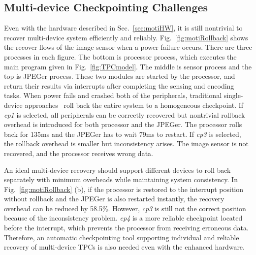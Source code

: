 \subsection{Multi-device Checkpointing Challenges} \label{sec:motiSW}
\vspace{-5pt}
%
Even with the hardware described in Sec.~\ref{sec:motiHW}, it is still nontrivial to recover multi-device system efficiently and reliably. 
Fig.~\ref{fig:motiRollback} shows the recover flows of the image sensor when a power failure occurs.
There are three processes in each figure.
The bottom is processor process, which executes the main program given in Fig.~\ref{fig:TPCmodel}.
The middle is sensor process and the top is JPEGer process. 
These two modules are started by the processor, and return their results via interrupts after completing the sensing and encoding tasks.
When power fails and crashed both of the peripherals, traditional single-device approaches~\cite{ransford2012mementos, balsamo2015hibernus, jayakumar2014quickrecall} roll back the entire system to a homogeneous checkpoint.
If \emph{cp1} is selected, all peripherals can be correctly recovered but nontrivial rollback overhead is introduced for both processor and the JPEGer. 
The processor rolls back for 135ms and the JPEGer has to wait 79ms to restart.
If \emph{cp3} is selected, the rollback overhead is smaller but inconsistency arises. 
The image sensor is not recovered, and the processor receives wrong data.

An ideal multi-device recovery should support different devices to roll back separately with minimum overheads while maintaining system consistency. 
In Fig.~\ref{fig:motiRollback} (b), if the processor is restored to the interrupt position without rollback and the JPEGer is also restarted instantly, the recovery overhead can be reduced by 58.5\%.
However,  \emph{cp3} is still not the correct position because of the inconsistency problem. \emph{cp4} is a more reliable checkpoint located before the interrupt, which prevents the processor from receiving erroneous data.
Therefore, an automatic checkpointing tool supporting individual and reliable recovery of multi-device  TPCs is also needed even with the enhanced hardware. 










